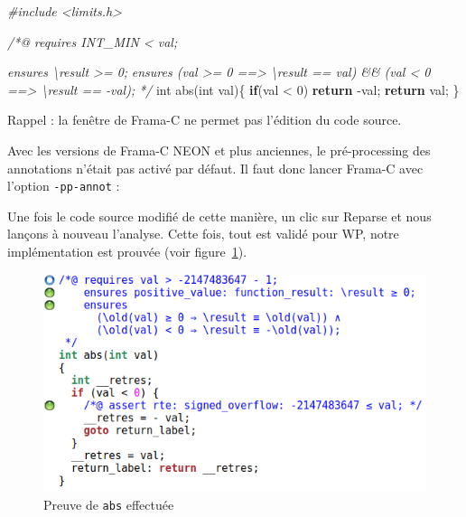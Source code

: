 \documentclass[12pt,francais,]{scrbook}
\newenvironment{Shaded}{}{}
\newcommand{\KeywordTok}[1]{\textcolor[rgb]{0.00,0.44,0.13}{\textbf{{#1}}}}
\newcommand{\DataTypeTok}[1]{\textcolor[rgb]{0.56,0.13,0.00}{{#1}}}
\newcommand{\DecValTok}[1]{\textcolor[rgb]{0.25,0.63,0.44}{{#1}}}
\newcommand{\CommentTok}[1]{\textcolor[rgb]{0.38,0.63,0.69}{\textit{{#1}}}}
\newcommand{\NormalTok}[1]{{#1}}
\newenvironment{zdsalertblock}[1]{%
  \tcolorbox[beamer,%
    noparskip,breakable,
    colback=LightCoral,colframe=DarkRed,%
    colbacklower=Tomato,%
    title=#1]
}{\endtcolorbox}
\newenvironment{zdsblock}[1]{%
  \tcolorbox[beamer,%
    noparskip,breakable,
    colback=LightBlue,colframe=DarkBlue,%
    colbacklower=DarkBlue,%
    title=#1]
}{\endtcolorbox}
\begin{document}
\begin{footnotesize}\begin{Shaded}
\begin{Highlighting}[]
\CommentTok{#include <limits.h>}

\CommentTok{/*@}
\CommentTok{  requires INT_MIN < val;}

\CommentTok{  ensures \textbackslash{}result >= 0;}
\CommentTok{  ensures (val >= 0 ==> \textbackslash{}result == val) && }
\CommentTok{          (val < 0 ==> \textbackslash{}result == -val);}
\CommentTok{*/}
\DataTypeTok{int} \NormalTok{abs(}\DataTypeTok{int} \NormalTok{val)\{}
  \KeywordTok{if}\NormalTok{(val < }\DecValTok{0}\NormalTok{) }\KeywordTok{return} \NormalTok{-val;}
  \KeywordTok{return} \NormalTok{val;}
\NormalTok{\}}
\end{Highlighting}
\end{Shaded}\end{footnotesize}

\begin{zdsalertblock}{Attention}
  Rappel : la fenêtre de Frama-C ne permet pas
  l'édition du code source.
\end{zdsalertblock}

\begin{zdsblock}{Information}
  Avec les versions de Frama-C NEON et plus anciennes, le pré-processing
  des annotations n'était pas activé par défaut. Il faut donc lancer
  Frama-C avec l'option \texttt{-pp-annot} :

  \begin{footnotesize}\begin{Shaded}
  \end{Shaded}\end{footnotesize}
\end{zdsblock}
  
Une fois le code source modifié de cette manière, un clic sur
\og{}Reparse\fg{} et nous lançons à nouveau l'analyse. Cette fois, tout est
validé pour WP, notre implémentation est prouvée (voir
figure~\ref{fig:2-1-2-abs-1}).

\begin{figure}[htbp]
\centering
\includegraphics[scale=0.5]{2-1-2-abs-1.png}
\caption{Preuve de \texttt{abs} effectuée}
\label{fig:2-1-2-abs-1}
\end{figure}
\end{document}
